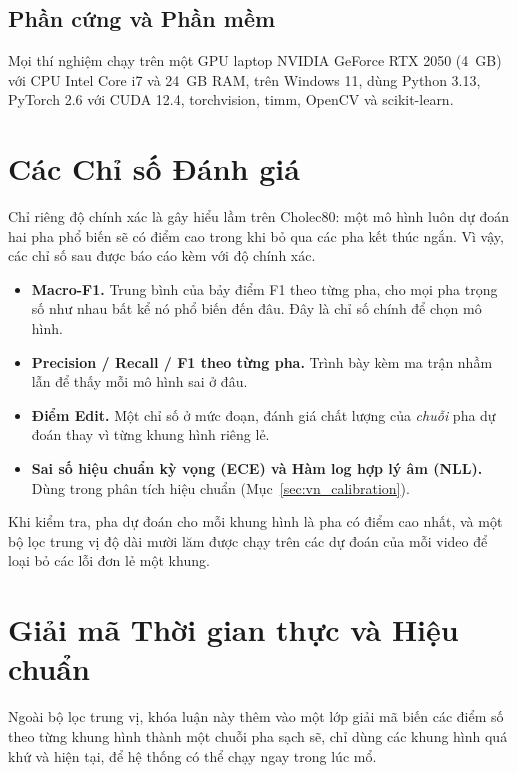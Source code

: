 \subsection{Phần cứng và Phần mềm}

Mọi thí nghiệm chạy trên một GPU laptop NVIDIA GeForce RTX 2050 (4~GB) với CPU Intel Core i7 và 24~GB RAM, trên Windows 11, dùng Python 3.13, PyTorch 2.6 với CUDA 12.4, torchvision, timm, OpenCV và scikit-learn.

\section{Các Chỉ số Đánh giá}

Chỉ riêng độ chính xác là gây hiểu lầm trên Cholec80: một mô hình luôn dự đoán hai pha phổ biến sẽ có điểm cao trong khi bỏ qua các pha kết thúc ngắn. Vì vậy, các chỉ số sau được báo cáo kèm với độ chính xác.

\begin{itemize}
    \item \textbf{Macro-F1.} Trung bình của bảy điểm F1 theo từng pha, cho mọi pha trọng số như nhau bất kể nó phổ biến đến đâu. Đây là chỉ số chính để chọn mô hình.
    \item \textbf{Precision / Recall / F1 theo từng pha.} Trình bày kèm ma trận nhầm lẫn để thấy mỗi mô hình sai ở đâu.
    \item \textbf{Điểm Edit.} Một chỉ số ở mức đoạn, đánh giá chất lượng của \emph{chuỗi} pha dự đoán thay vì từng khung hình riêng lẻ.
    \item \textbf{Sai số hiệu chuẩn kỳ vọng (ECE) và Hàm log hợp lý âm (NLL).} Dùng trong phân tích hiệu chuẩn (Mục~\ref{sec:vn_calibration}).
\end{itemize}

Khi kiểm tra, pha dự đoán cho mỗi khung hình là pha có điểm cao nhất, và một bộ lọc trung vị độ dài mười lăm được chạy trên các dự đoán của mỗi video để loại bỏ các lỗi đơn lẻ một khung.

\section{Giải mã Thời gian thực và Hiệu chuẩn}
\label{sec:vn_decoding}

Ngoài bộ lọc trung vị, khóa luận này thêm vào một lớp giải mã biến các điểm số theo từng khung hình thành một chuỗi pha sạch sẽ, chỉ dùng các khung hình quá khứ và hiện tại, để hệ thống có thể chạy ngay trong lúc mổ.

